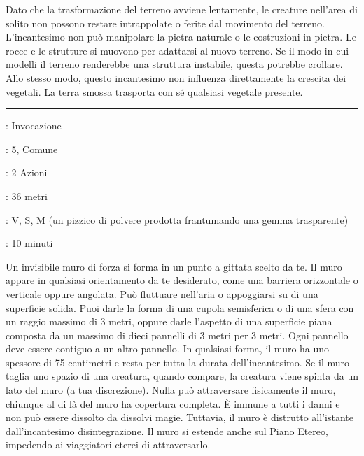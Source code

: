 \begin{multicols}{2}
Dato che la trasformazione del terreno avviene lentamente, le creature nell'area di solito non possono restare intrappolate o ferite dal movimento del terreno. L'incantesimo non può manipolare la pietra naturale o le costruzioni in pietra. Le rocce e le strutture si muovono per adattarsi al nuovo terreno. Se il modo in cui modelli il terreno renderebbe una struttura instabile, questa potrebbe crollare. Allo stesso modo, questo incantesimo non influenza direttamente la crescita dei vegetali. La terra smossa trasporta con sé qualsiasi vegetale presente.

\smallskip\noindent\rule{\linewidth}{2pt} \hypertarget{Muro di Forza}{}\medskip{}
\noindent
\begin{description}[noitemsep, topsep=0pt, parsep=0pt, partopsep=0pt, leftmargin=0cm, labelwidth=2.8cm]
	\item[\textbf{Lista di Magia}]: Invocazione
	\item[\textbf{Livello}]: 5, Comune
	\item[\textbf{T. di Lancio}]: 2 Azioni
	\item[\textbf{Gittata}]: 36 metri
	\item[\textbf{Componenti}]: V, S, M (un pizzico di polvere prodotta frantumando una gemma trasparente)
	\item[\textbf{Durata}]: 10 minuti
\end{description}

Un invisibile muro di forza si forma in un punto a gittata scelto da te. Il muro appare in qualsiasi orientamento da te desiderato, come una barriera orizzontale o verticale oppure angolata. Può fluttuare nell'aria o appoggiarsi su di una superficie solida. Puoi darle la forma di una cupola semisferica o di una sfera con un raggio massimo di 3 metri, oppure darle l'aspetto di una superficie piana composta da un massimo di dieci pannelli di 3 metri per 3 metri. Ogni pannello deve essere contiguo a un altro pannello. In qualsiasi forma, il muro ha uno spessore di 75 centimetri e resta per tutta la durata dell'incantesimo. Se il muro taglia uno spazio di una creatura, quando compare, la creatura viene spinta da un lato del muro (a tua discrezione). Nulla può attraversare fisicamente il muro, chiunque al di là del muro ha copertura completa. È immune a tutti i danni e non può essere dissolto da dissolvi magie. Tuttavia, il muro è distrutto all'istante dall'incantesimo disintegrazione. Il muro si estende anche sul Piano Etereo, impedendo ai viaggiatori eterei di attraversarlo.


\end{multicols}
